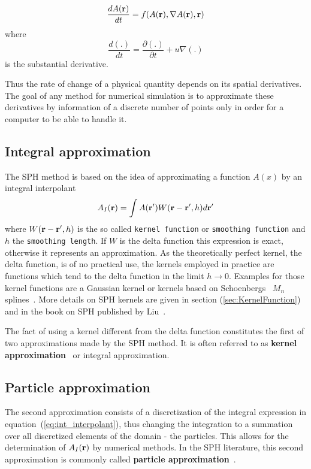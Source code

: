 \documentclass{report}
\begin{document}
\begin {equation}
\label{eq:EFD_form}
{\frac{dA({\bf r})}{dt}}=f(A({\bf r}),\nabla A({\bf r}),{\bf r})
\end {equation}
where
\begin {equation}
{\frac{d(.)}{dt}}={\frac{\partial(.)}{ \partial t}}+u\nabla(.)
\end{equation}
is the substantial derivative.

Thus the rate of change of a physical quantity depends on its spatial
derivatives. The goal of any method for numerical simulation is to approximate
these derivatives by information of a discrete number of points only in order for a computer to be able to handle it. 

\subsection{Integral approximation}

The SPH method is based on the idea of approximating a function $A(x)$ by an
integral interpolant
\begin{equation}
\label{eq:int_interpolant}
A_I({\bf r})=\int A({\bf r'})W({\bf r}-{\bf r'},h)d{\bf r'}
\end{equation}
where $W({\bf r}-{\bf r'},h)$ is the so called {\tt kernel function} or {\tt smoothing function} and $h$ the
{\tt smoothing length}. If $W$ is the delta function this expression is exact,
otherwise it represents an approximation. As the theoretically
perfect kernel, the delta function, is of no practical use, the kernels
employed in practice are functions which tend to the delta function in the 
limit $h\rightarrow 0$.
Examples for those kernel functions are a Gaussian kernel or
kernels based on Schoenbergs~\cite{Schoenberg1946} $M_n$ splines~\cite{Monaghan2005}.
More details on SPH kernels are given in section
(\ref{sec:KernelFunction}) and in the book on SPH published by Liu~\cite{Liu2003}.

The fact of using a kernel different from the delta function constitutes the
first of two approximations made by the SPH method. It is often referred to as {\bf kernel approximation}~\cite{Liu2003} or integral approximation.

\subsection{Particle approximation}
The second approximation consists of a discretization of the integral
expression in equation~(\ref{eq:int_interpolant}), thus changing the integration
to a summation over all discretized elements of the domain - the particles. 
This allows for the determination of $A_I(\bf{r})$ by numerical methods. In the SPH
literature, this second approximation is commonly called {\bf particle
approximation}~\cite{Liu2003}.
\end{document}
